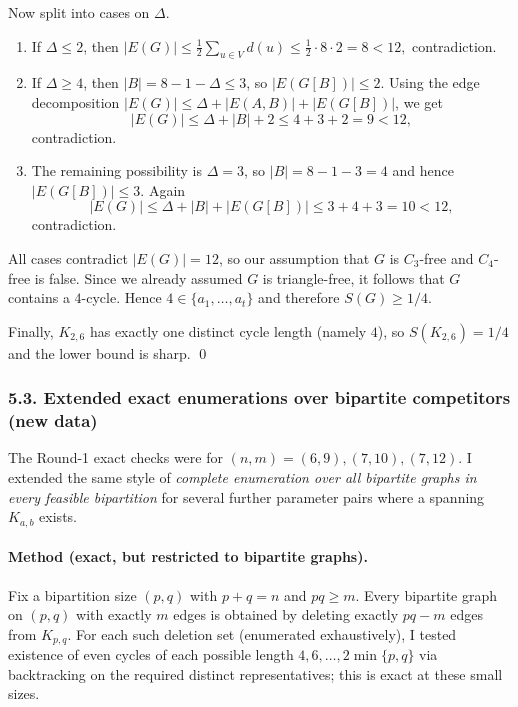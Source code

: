 Now split into cases on $\Delta$.
\begin{enumerate}
\item If $\Delta\le 2$, then
\(
|E(G)|\le \tfrac12\sum_{u\in V} d(u)\le \tfrac12\cdot 8\cdot 2=8<12,
\)
contradiction.
\item If $\Delta\ge 4$, then $|B|=8-1-\Delta\le 3$, so $|E(G[B])|\le 2$.
Using the edge decomposition
\(|E(G)|\le \Delta + |E(A,B)| + |E(G[B])|\), we get
\[
|E(G)|\le \Delta + |B| + 2\le 4+3+2=9<12,
\]
contradiction.
\item The remaining possibility is $\Delta=3$, so $|B|=8-1-3=4$ and hence $|E(G[B])|\le 3$.
Again
\[
|E(G)|\le \Delta + |B| + |E(G[B])|\le 3+4+3=10<12,
\]
contradiction.
\end{enumerate}
All cases contradict $|E(G)|=12$, so our assumption that $G$ is $C_3$-free and $C_4$-free is false.
Since we already assumed $G$ is triangle-free, it follows that $G$ contains a $4$-cycle.
Hence $4\in\{a_1,\dots,a_t\}$ and therefore
\(
S(G)\ge 1/4.
\)

Finally, $K_{2,6}$ has exactly one distinct cycle length (namely $4$), so $S(K_{2,6})=1/4$ and the lower bound is sharp. \qed

\subsubsection*{5.3. Extended exact enumerations over bipartite competitors (new data)}
The Round-1 exact checks were for $(n,m)=(6,9),(7,10),(7,12)$. I extended the same style of \emph{complete enumeration over all bipartite graphs in every feasible bipartition} for several further parameter pairs where a spanning $K_{a,b}$ exists.

\paragraph{Method (exact, but restricted to bipartite graphs).}
Fix a bipartition size $(p,q)$ with $p+q=n$ and $pq\ge m$.
Every bipartite graph on $(p,q)$ with exactly $m$ edges is obtained by deleting exactly $pq-m$ edges from $K_{p,q}$.
For each such deletion set (enumerated exhaustively), I tested existence of even cycles of each possible length $4,6,\dots,2\min\{p,q\}$ via backtracking on the required distinct representatives; this is exact at these small sizes.

